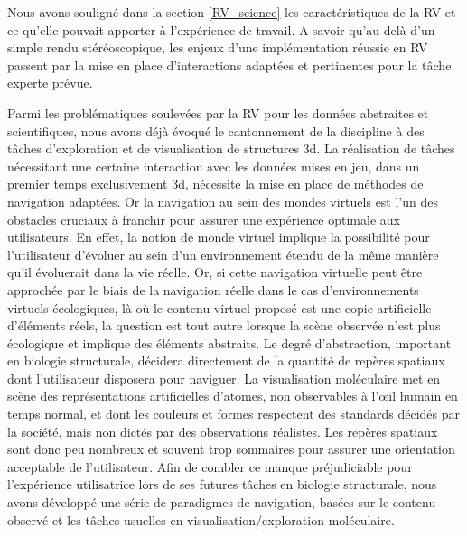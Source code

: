 Nous avons souligné dans la section \ref{RV_science} les caractéristiques de la RV et ce qu'elle pouvait apporter à l'expérience de travail. A savoir qu'au-delà d'un simple rendu stéréoscopique, les enjeux d'une implémentation réussie en RV passent par la mise en place d'interactions adaptées et pertinentes pour la tâche experte prévue.

Parmi les problématiques soulevées par la RV pour les données abstraites et scientifiques, nous avons déjà évoqué le cantonnement de la discipline à des tâches d'exploration et de visualisation de structures 3d. La réalisation de tâches nécessitant une certaine interaction avec les données mises en jeu, dans un premier temps exclusivement 3d, nécessite la mise en place de méthodes de navigation adaptées. Or la navigation au sein des mondes virtuels est l'un des obstacles cruciaux à franchir pour assurer une expérience optimale aux utilisateurs. En effet, la notion de monde virtuel implique la possibilité pour l'utilisateur d'évoluer au sein d'un environnement étendu de la même manière qu'il évoluerait dans la vie réelle. Or, si cette navigation virtuelle peut être approchée par le biais de la navigation réelle dans le cas d'environnements virtuels écologiques, là où le contenu virtuel proposé est une copie artificielle d'éléments réels, la question est tout autre lorsque la scène observée n'est plus écologique et implique des éléments abstraits. Le degré d'abstraction, important en biologie structurale, décidera directement de la quantité de repères spatiaux dont l'utilisateur disposera pour naviguer. La visualisation moléculaire met en scène des représentations artificielles d'atomes, non observables à l’œil humain en temps normal, et dont les couleurs et formes respectent des standards décidés par la société, mais non dictés par des observations réalistes. Les repères spatiaux sont donc peu nombreux et souvent trop sommaires pour assurer une orientation acceptable de l'utilisateur. Afin de combler ce manque préjudiciable pour l'expérience utilisatrice lors de ses futures tâches en biologie structurale, nous avons développé une série de paradigmes de navigation, basées sur le contenu observé et les tâches usuelles en visualisation/exploration moléculaire.

